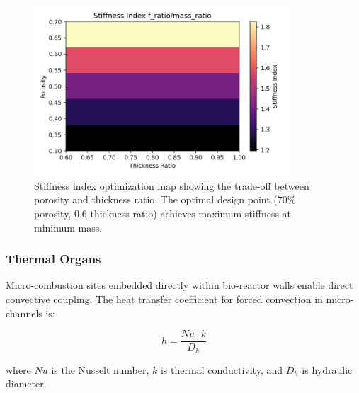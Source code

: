 \begin{figure}[H]
    \centering
    \includegraphics[width=0.85\textwidth]{figures/simulations/stiffness_index_heatmap.png}
    \caption{Stiffness index optimization map showing the trade-off between porosity and thickness ratio. The optimal design point (70\% porosity, 0.6 thickness ratio) achieves maximum stiffness at minimum mass.}
    \label{fig:stiffness_heatmap}
\end{figure}

\subsubsection{Thermal Organs}
Micro-combustion sites embedded directly within bio-reactor walls enable direct convective coupling. The heat transfer coefficient for forced convection in micro-channels is:

\begin{equation}
    h = \frac{Nu \cdot k}{D_h}
\end{equation}

where $Nu$ is the Nusselt number, $k$ is thermal conductivity, and $D_h$ is hydraulic diameter.

